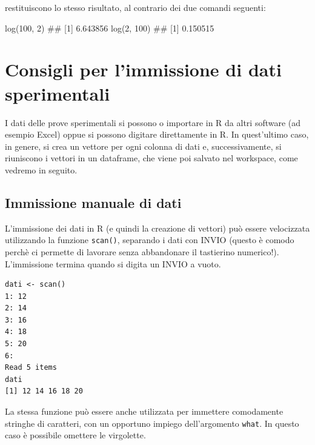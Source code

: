 \documentclass[a4paper,12pt,oneside]{book}
\newenvironment{Shaded}{}{}
\newcommand{\KeywordTok}[1]{#1}
\newcommand{\DecValTok}[1]{#1}
\newcommand{\CommentTok}[1]{#1}
\newcommand{\NormalTok}[1]{#1}
\begin{document}
restituiscono lo stesso risultato, al contrario dei due comandi seguenti:

\begin{Shaded}
\begin{Highlighting}[]
\KeywordTok{log}\NormalTok{(}\DecValTok{100}\NormalTok{, }\DecValTok{2}\NormalTok{)}
\CommentTok{## [1] 6.643856}
\KeywordTok{log}\NormalTok{(}\DecValTok{2}\NormalTok{, }\DecValTok{100}\NormalTok{)}
\CommentTok{## [1] 0.150515}
\end{Highlighting}
\end{Shaded}

\hypertarget{consigli-per-limmissione-di-dati-sperimentali}{%
\section*{Consigli per l'immissione di dati sperimentali}\label{consigli-per-limmissione-di-dati-sperimentali}}

I dati delle prove sperimentali si possono o importare in R da altri software (ad esempio Excel) oppue si possono digitare direttamente in R. In quest'ultimo caso, in genere, si crea un vettore per ogni colonna di dati e, successivamente, si riuniscono i vettori in un dataframe, che viene poi salvato nel workspace, come vedremo in seguito.

\hypertarget{immissione-manuale-di-dati}{%
\subsection*{Immissione manuale di dati}\label{immissione-manuale-di-dati}}

L'immissione dei dati in R (e quindi la creazione di vettori) può essere velocizzata utilizzando la funzione \texttt{scan()}, separando i dati con INVIO (questo è comodo perchè ci permette di lavorare senza abbandonare il tastierino numerico!). L'immissione termina quando si digita un INVIO a vuoto.

\begin{verbatim}
dati <- scan()
1: 12
2: 14
3: 16
4: 18
5: 20
6:
Read 5 items
dati
[1] 12 14 16 18 20
\end{verbatim}

La stessa funzione può essere anche utilizzata per immettere comodamente stringhe di caratteri, con un opportuno impiego dell'argomento \texttt{what}. In questo caso è possibile omettere le virgolette.
\end{document}
